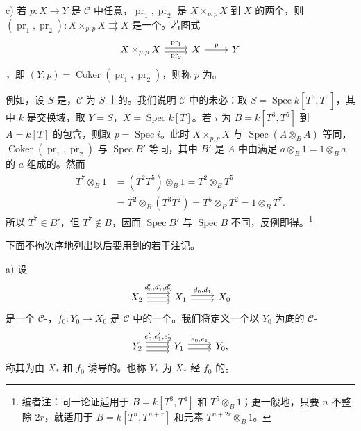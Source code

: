c) 若 $p:X\to Y$ 是 $\mathcal C$ 中任意，$\operatorname{pr}_1,\operatorname{pr}_2$ 是 $X\times_{p,p}X$ 到 $X$ 的两个，则 $(\operatorname{pr}_1,\operatorname{pr}_2):X\times_{p,p}X\rightrightarrows X$ 是一个。若图式
\[
\begin{tikzcd}
X\times_{p,p}X\arrow[r,shift left=.5ex,"\operatorname{pr}_1"]\arrow[r,shift right=.5ex,"\operatorname{pr}_2"']&X\arrow[r,"p"]&Y
\end{tikzcd}
\]
，即 $(Y,p)=\operatorname{Coker}(\operatorname{pr}_1,\operatorname{pr}_2)$，则称 $p$ 为。

例如，设 $S$ 是，$\mathcal C$ 为 $S$ 上的。我们说明 $\mathcal C$ 中的未必：取 $S=\operatorname{Spec}k[T^3,T^5]$，其中 $k$ 是交换域，取 $Y=S$，$X=\operatorname{Spec}k[T]$。若 $i$ 为 $B=k[T^3,T^5]$ 到 $A=k[T]$ 的包含，则取 $p=\operatorname{Spec}i$。此时 $X\times_{p,p}X$ 与 $\operatorname{Spec}(A\otimes_B A)$ 等同，$\operatorname{Coker}(\operatorname{pr}_1,\operatorname{pr}_2)$ 与 $\operatorname{Spec}B'$ 等同，其中 $B'$ 是 $A$ 中由满足 $a\otimes_B1=1\otimes_Ba$ 的 $a$ 组成的。然而
\[
\begin{aligned}
T^7\otimes_B1&=(T^2T^5)\otimes_B1=T^2\otimes_BT^5\\
&=T^2\otimes_B(T^3T^2)=T^5\otimes_BT^2=1\otimes_BT^7.
\end{aligned}
\]
所以 $T^7\in B'$，但 $T^7\notin B$，因而 $\operatorname{Spec}B'$ 与 $\operatorname{Spec}B$ 不同，反例即得。\footnote{编者注：同一论证适用于 $B=k[T^3,T^4]$ 和 $T^5\otimes_B1$；更一般地，只要 $n$ 不整除 $2r$，就适用于 $B=k[T^n,T^{n+r}]$ 和元素 $T^{n+2r}\otimes_B1$。}

下面不拘次序地列出以后要用到的若干注记。

a) 设
\[
\begin{tikzcd}
X_2\arrow[r,shift left=1ex,"{d'_0,d'_1,d'_2}"]\arrow[r]\arrow[r,shift right=1ex]&X_1\arrow[r,shift left=.5ex,"{d_0,d_1}"]\arrow[r,shift right=.5ex]&X_0
\end{tikzcd}
\]
是一个 $\mathcal C$-，$f_0:Y_0\to X_0$ 是 $\mathcal C$ 中的一个。我们将定义一个以 $Y_0$ 为底的 $\mathcal C$-
\[
\begin{tikzcd}
Y_2\arrow[r,shift left=1ex,"{e'_0,e'_1,e'_2}"]\arrow[r]\arrow[r,shift right=1ex]&Y_1\arrow[r,shift left=.5ex,"{e_0,e_1}"]\arrow[r,shift right=.5ex]&Y_0,
\end{tikzcd}
\]
称其为由 $X_*$ 和 $f_0$ 诱导的。也称 $Y_*$ 为 $X_*$ 经 $f_0$ 的。

